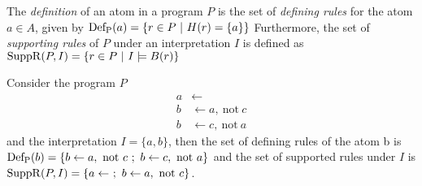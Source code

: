 \begin{comment}
\begin{definition}
\label{def:herbrand universe}
    The \emph{herbrand universe} of a program $P$, \(\text{HU}_P\), is the set of all \emph{ground terms} that can be formed from all the constant symbols and function symbols in $P$.
\end{definition}

\begin{example}
\label{ex:herbrand universe}
    Let \(P = \{a \leftarrow\ ;\ b \leftarrow a\}\) then the set of constant symbols in $P$ is \(\{a,b\}\) and the set of function symbols is \(\emptyset\) as this is a propositional program. In this case \(\text{HU}_P = \{a,b\}\).
\end{example}

\begin{definition}
\label{def:herbrand base}
    The \emph{herbrand base} of a program $P$, \(\text{HB}_P\), is the set of all ground atomic formulas that can be formed from all the predicate symbols of $P$ and the terms in \(\text{HU}_P\).
\end{definition}

\begin{example}
\label{ex:herbrand base}
    For the program used in the previous example, there are no predicate symbols. Therefore \(\text{HB}_{P} = \text{HU}_{P} = \{a,b\}\). This is also true for any other propositional program. 
\end{example}
\end{comment}

The \emph{definition} of an atom in a program $P$ is the set of \emph{defining rules} for the atom \(a \in A\), given by
\(
    \operatorname{Def_P}(a) = \{r \in P \ | \ H(r) = \{a\}\}
\)
Furthermore, the set of \emph{supporting rules} of $P$ under an interpretation $I$ is defined as
\(
    \SuppR(P, I) = \{r \in P \ | \ I \models B(r)\}
\)
\begin{example}
\label{ex:def/supp}
    Consider the program $P$
    \begin{align*}
        a &\leftarrow \\
        b &\leftarrow a,\ \text{not}\ c \\
        b &\leftarrow c,\ \text{not}\ a
    \end{align*}
    and the interpretation \(I = \{a, b\}\), then the set of defining rules of the atom b is \(\operatorname{Def_P}(b) = \{b \leftarrow a,\ \text{not}\ c\ ;\ b \leftarrow c,\ \text{not}\ a\}\) and the set of supported rules under $I$ is \(\operatorname{SuppR}(P, I) = \{a \leftarrow\ ;\ b \leftarrow a,\ \text{not}\ c\}\).
\end{example}

